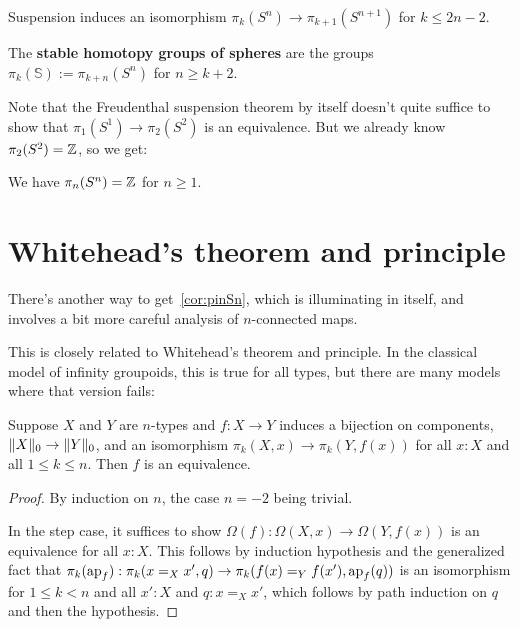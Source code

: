\documentclass[10pt,oneside,leqno,openright]{memoir}
\begin{document}
\begin{corollary}
  Suspension induces an isomorphism $\pi_k(S^n) \to \pi_{k+1}(S^{n+1})$ for $k\le 2n-2$.
\end{corollary}
\begin{definition}
  The \textbf{stable homotopy groups of spheres} are the groups $\pi_k(\mathbb{S})
  := \pi_{k+n}(S^n)$ for $n \ge k+2$.
\end{definition}
Note that the Freudenthal suspension theorem by itself doesn't quite suffice to show that
$\pi_1(S^1) \to \pi_2(S^2)$ is an equivalence. But we already know $\pi_2(S^2)=\mathbb{Z}$, so we get:
\begin{corollary}\label{cor:pinSn}
  We have $\pi_n(S^n) = \mathbb{Z}$ for $n\ge 1$.
\end{corollary}

\section*{Whitehead's theorem and principle}

There's another way to get~\cref{cor:pinSn}, which is illuminating in itself,
and involves a bit more careful analysis of $n$-connected maps.

This is closely related to Whitehead's theorem and principle. In the classical model of infinity groupoids, this is true for all types, but there are many models where that version fails:
\begin{theorem}[Whitehead]
  \label{thm:whitehead}
  Suppose $X$ and $Y$ are $n$-types and $f:X\to Y$ induces a bijection on
  components, $\lVert X\rVert_0 \to \lVert Y\rVert_0$, and an isomorphism
  $\pi_k(X,x) \to \pi_k(Y,f(x))$ for all $x:X$ and all $1\le k\le n$.
  Then $f$ is an equivalence.
\end{theorem}
\begin{proof}
  By induction on $n$, the case $n=-2$ being trivial.

  In the step case, it suffices to show
  $\Omega(f) : \Omega(X,x) \to \Omega(Y,f(x))$ is an equivalence for all $x:X$.
  This follows by induction hypothesis and the generalized fact that
  $\pi_k(\operatorname{ap}_f) : \pi_k(x=_Xx',q) \to \pi_k(f(x)=_Yf(x'), \operatorname{ap}_f(q))$ is an
  isomorphism for $1\le k < n$ and all $x':X$ and $q:x=_Xx'$, which follows by
  path induction on $q$ and then the hypothesis.
\end{proof}
\end{document}
